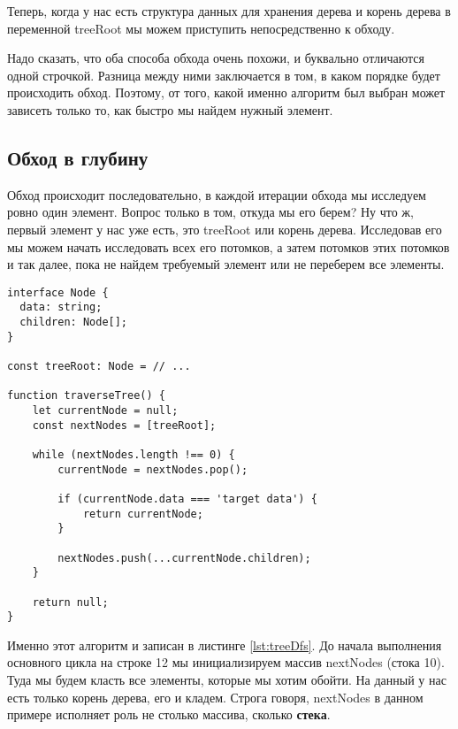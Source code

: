 \documentclass[../article.tex]{subfiles}
\begin{document}
Теперь, когда у нас есть структура данных для хранения дерева и корень дерева в переменной {\firacodebold treeRoot} мы можем приступить непосредственно к обходу.

Надо сказать, что оба способа обхода очень похожи, и буквально отличаются одной строчкой. Разница между ними заключается в том, в каком порядке будет происходить обход. Поэтому, от того, какой именно алгоритм был выбран может зависеть только то, как быстро мы найдем нужный элемент.

\subsection{Обход в глубину}

Обход происходит последовательно, в каждой итерации обхода мы исследуем ровно один элемент. Вопрос только в том, откуда мы его берем? Ну что ж, первый элемент у нас уже есть, это {\firacodebold treeRoot} или корень дерева. Исследовав его мы можем начать исследовать всех его потомков, а затем потомков этих потомков и так далее, пока не найдем требуемый элемент или не переберем все элементы.

\begin{strip}
    \begin{topruledelement}
        \begin{lstlisting}[caption={Обход дерева в глубину}, label={lst:treeDfs}]
interface Node {
  data: string;
  children: Node[];
}

const treeRoot: Node = // ...

function traverseTree() {
    let currentNode = null;
    const nextNodes = [treeRoot];

    while (nextNodes.length !== 0) {
        currentNode = nextNodes.pop();

        if (currentNode.data === 'target data') {
            return currentNode;
        }

        nextNodes.push(...currentNode.children);
    }

    return null;
}

        \end{lstlisting}
    \end{topruledelement}
\end{strip}

Именно этот алгоритм и записан в листинге \ref{lst:treeDfs}. До начала выполнения основного цикла на строке 12 мы инициализируем массив {\firacodebold nextNodes} (стока 10). Туда мы будем класть все элементы, которые мы хотим обойти. На данный у нас есть только корень дерева, его и кладем. Строга говоря, {\firacodebold nextNodes} в данном примере исполняет роль не столько массива, сколько {\bfseries стека}.
\end{document}
